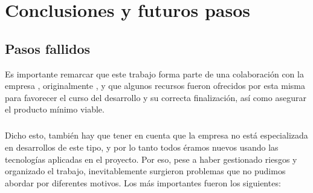 \documentclass{subfiles}
\begin{document}
    \chapter{Conclusiones y futuros pasos}
    \label{chap:6}

    \section{Pasos fallidos}
    \label{sec:pasos_fallidos}
    
    Es importante remarcar que este trabajo forma parte de una colaboración con la empresa \thirdera, originalmente \silverstorm, y que algunos recursos fueron ofrecidos por esta misma para favorecer el curso del desarrollo y su correcta finalización, así como asegurar el producto mínimo viable.

    \paragraph{}
    Dicho esto, también hay que tener en cuenta que la empresa no está especializada en desarrollos de este tipo, y por lo tanto todos éramos nuevos usando las tecnologías aplicadas en el proyecto. Por eso, pese a haber gestionado riesgos y organizado el trabajo, inevitablemente surgieron problemas que no pudimos abordar por diferentes motivos. Los más importantes fueron los siguientes:
\end{document}
